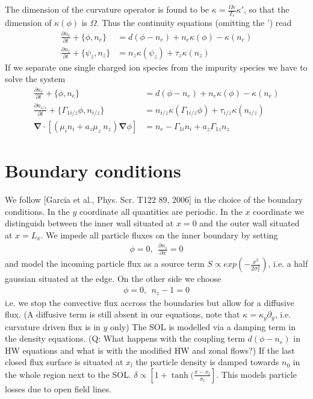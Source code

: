 \documentclass[a4paper,12pt]{scrartcl}
\renewcommand{\vec}[1]{{\mathbf{#1}}}
\begin{document}
The dimension of the curvature operator is found to be
$\kappa = \frac{\Omega e}{T_e}\kappa'$, 
so that the dimension of $\kappa(\phi)$ is $\Omega$.
Thus the continuity equations (omitting the ') read
\begin{subequations}
\begin{align}
    \frac{\partial n_e}{\partial t} + \{\phi, n_e\} &= d( \phi - n_e) + n_e\kappa(\phi) -
    \kappa(n_e) \\
    \frac{\partial n_z}{\partial t} + \{\psi_z, n_z\} &= n_z\kappa(\psi_z) +
    \tau_z\kappa(n_z) 
    \label{}
\end{align}
\end{subequations}
If we separate one single charged ion species from the impurity species we 
have to solve the system
\begin{subequations}
    \begin{align}
    \frac{\partial n_e}{\partial t} + \{\phi, n_e\} &= d( \phi - n_e) + n_e\kappa(\phi) -
    \kappa(n_e) \\
    \frac{\partial n_{i/z}}{\partial t} + \{\Gamma_{1i/z}\phi, n_{i/z}\} &= 
    n_{i/z}\kappa(\Gamma_{1i/z}\phi) + \tau_{i/z}\kappa(n_{i/z}) \\
    \vec \nabla\cdot\left[ (\mu_i n_i + a_z \mu_z\ n_z)\vec \nabla \phi \right] &= 
        n_e - \Gamma_{1i}n_i + a_z \Gamma_{1z} n_z
        \label{}
    \end{align}
    \label{}
\end{subequations}

\section{Boundary conditions}
We follow [Garcia et al., Phys. Scr. T122 89, 2006] in the choice of 
the boundary conditions. 
In the $y$ coordinate all quantities are periodic. 
In the $x$ coordinate we distinguish between the inner wall situated at $x=0$ and
the outer wall situated at $x=L_x$.
We impede all particle fluxes on the inner boundary by setting
\begin{align}
    \phi = 0, \ \ \frac{\partial n_z}{\partial x} = 0
    \label{}
\end{align} 
and model the incoming particle flux as a source term $S\propto exp\left( -\frac{x^2}{2\sigma_x^2} \right)$, i.e. a half gaussian situated at the edge. 
On the other side we choose
\begin{align}
    \phi = 0, \ \ n_z-1=0
    \label{}
\end{align}
i.e. we stop the convective flux accross the boundaries but allow for a diffusive
flux. (A diffusive term is still absent in our equations, note 
that $\kappa = \kappa_y\partial_y$, i.e. curvature driven flux is in $y$ only)
The SOL is modelled via a damping term in the density equations. (Q: What happens
with the coupling term $d(\phi-n_e)$ in HW equations and what is 
with the modified HW and zonal flows?) If the last closed flux surface is situated
at $x_l$ the particle density is damped towards $n_0$ in the whole region
next to the SOL. $\delta \propto [1+\tanh(\frac{x-x_l}{\sigma_l}]$. This
models particle losses due to open field lines.
\end{document}
